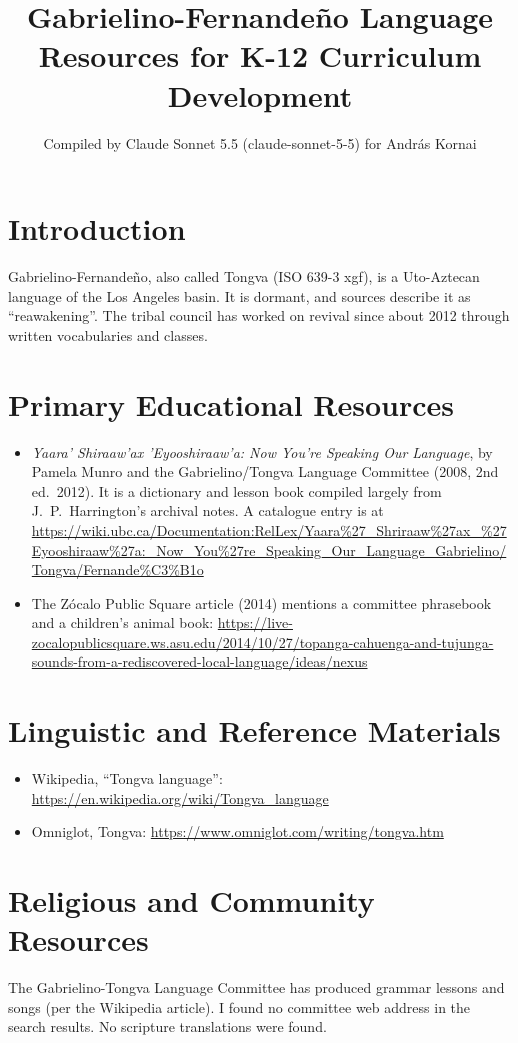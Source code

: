 \documentclass[12pt]{article}
\title{Gabrielino-Fernande\~no Language Resources for K-12 Curriculum Development}
\author{Compiled by Claude Sonnet 5.5 (claude-sonnet-5-5) for Andr\'as Kornai}
\date{}
\begin{document}
\maketitle

\section{Introduction}
Gabrielino-Fernande\~no, also called Tongva (ISO 639-3 xgf), is a Uto-Aztecan language of the Los Angeles basin. It is dormant, and sources describe it as ``reawakening''. The tribal council has worked on revival since about 2012 through written vocabularies and classes.

\section{Primary Educational Resources}
\begin{itemize}
\item \emph{Yaara' Shiraaw'ax '\!Eyooshiraaw'a: Now You're Speaking Our Language}, by Pamela Munro and the Gabrielino/Tongva Language Committee (2008, 2nd ed.\ 2012). It is a dictionary and lesson book compiled largely from J.\ P.\ Harrington's archival notes. A catalogue entry is at \url{https://wiki.ubc.ca/Documentation:RelLex/Yaara%27_Shriraaw%27ax_%27Eyooshiraaw%27a:_Now_You%27re_Speaking_Our_Language_Gabrielino/Tongva/Fernande%C3%B1o}
\item The Zócalo Public Square article (2014) mentions a committee phrasebook and a children's animal book: \url{https://live-zocalopublicsquare.ws.asu.edu/2014/10/27/topanga-cahuenga-and-tujunga-sounds-from-a-rediscovered-local-language/ideas/nexus}
\end{itemize}

\section{Linguistic and Reference Materials}
\begin{itemize}
\item Wikipedia, ``Tongva language'': \url{https://en.wikipedia.org/wiki/Tongva_language}
\item Omniglot, Tongva: \url{https://www.omniglot.com/writing/tongva.htm}
\end{itemize}

\section{Religious and Community Resources}
The Gabrielino-Tongva Language Committee has produced grammar lessons and songs (per the Wikipedia article). I found no committee web address in the search results. No scripture translations were found.
\end{document}
